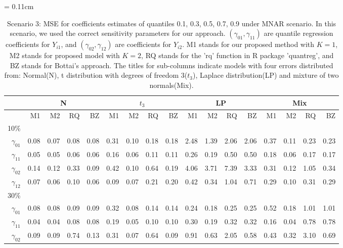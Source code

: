 \documentclass[useAMS,usenatbib,referee]{biom}
\begin{document}
  \begin{table}
\centering
    \caption{Scenario 3: MSE for coefficients estimates of quantiles 0.1, 0.3, 0.5, 0.7, 0.9 under MNAR scenario.
In this scenario, we used the correct sensitivity parameters for our approach.
$(\gamma_{01}, \gamma_{11})$ are quantile regression coefficients for $Y_{i1}$, and $(\gamma_{02}, \gamma_{12})$ are coefficients for $Y_{i2}$. M1 stands for our proposed method with $K = 1$, M2 stands for proposed model with $K = 2$, RQ stands for the 'rq' function in R package 'quantreg', and BZ stands for Bottai's approach.
The titles for sub-columns indicate models with four errors distributed from: Normal(N), t distribution with degrees of freedom 3($t_3$),
Laplace distribution(LP) and mixture of two normals(Mix).
}\label{tab:sim3}
    \vspace{10pt} \tabcolsep = 0.11cm
    \begin{tabular}{rrrrrrrrrrrrrrrrr}
      \hline
              & \multicolumn{4}{c}{N} & \multicolumn{4}{c}{$t_3$}   & \multicolumn{4}{c}{LP}   & \multicolumn{4}{c}{Mix}   \\
      \hline
           & M1                      & M2 & RQ & BZ   & M1                      & M2 & RQ & BZ   & M1                      & M2 & RQ & BZ   & M1                      & M2 & RQ & BZ \\
10\%  \\
$\gamma_{01}$ & 0.08 & 0.07 & 0.08 & 0.08 & 0.31 & 0.10 & 0.18 & 0.18 & 2.48 & 1.39 & 2.06 & 2.06 & 0.37 & 0.11 & 0.23 & 0.23 \\
$\gamma_{11}$ & 0.05 & 0.05 & 0.06 & 0.06 & 0.16 & 0.06 & 0.11 & 0.11 & 0.26 & 0.19 & 0.50 & 0.50 & 0.18 & 0.06 & 0.17 & 0.17 \\
$\gamma_{02}$ & 0.14 & 0.12 & 0.33 & 0.09 & 0.42 & 0.10 & 0.64 & 0.19 & 4.06 & 3.71 & 7.39 & 3.33 & 0.31 & 0.12 & 1.05 & 0.34 \\
$\gamma_{12}$ & 0.07 & 0.06 & 0.10 & 0.06 & 0.09 & 0.07 & 0.21 & 0.20 & 0.42 & 0.34 & 1.04 & 0.71 & 0.29 & 0.10 & 0.31 & 0.29 \\
30\% \\
$\gamma_{01}$ & 0.08 & 0.08 & 0.09 & 0.09 & 0.32 & 0.08 & 0.14 & 0.14 & 0.24 & 0.18 & 0.25 & 0.25 & 0.52 & 0.18 & 1.01 & 1.01 \\
$\gamma_{11}$ & 0.04 & 0.04 & 0.08 & 0.08 & 0.19 & 0.05 & 0.10 & 0.10 & 0.30 & 0.19 & 0.32 & 0.32 & 0.16 & 0.04 & 0.78 & 0.78 \\
$\gamma_{02}$ & 0.09 & 0.09 & 0.74 & 0.13 & 0.31 & 0.07 & 0.64 & 0.09 & 0.91 & 0.63 & 2.05 & 0.58 & 0.43 & 0.32 & 3.10 & 0.69 \\

\end{tabular}
\end{table}
\end{document}
